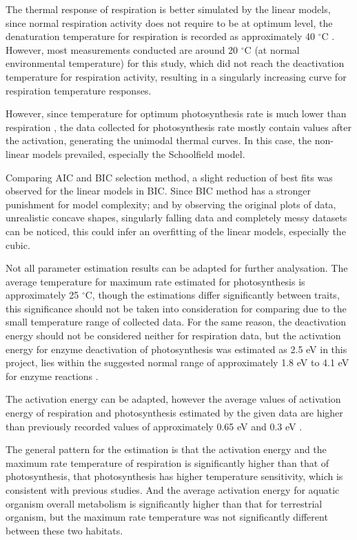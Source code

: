 \documentclass[11pt, a4paper]{article}
\begin{document}
\begin{spacing}{1.5}
The thermal response of respiration is better simulated by the linear models, since normal respiration activity does not require to be at optimum level, the denaturation temperature for respiration is recorded as approximately 40 $^{\circ}$C \citep{sage2007temperature}. However, most measurements conducted are around 20 $^{\circ}$C (at normal environmental temperature) for this study, which did not reach the deactivation temperature for respiration activity, resulting in a singularly increasing curve for respiration temperature responses. 

However, since temperature for optimum photosynthesis rate is much lower than respiration \citep{liu2018optimum}, the data collected for photosynthesis rate mostly contain values after the activation, generating the unimodal thermal curves. In this case, the non-linear models prevailed, especially the Schoolfield model. 

Comparing AIC and BIC selection method, a slight reduction of best fits was observed for the linear models in BIC. Since BIC method has a stronger punishment for model complexity; and by observing the original plots of data, unrealistic concave shapes, singularly falling data and completely messy datasets can be noticed, this could infer an overfitting of the linear models, especially the cubic. 

Not all parameter estimation results can be adapted for further analysation. The average temperature for maximum rate estimated for photosynthesis is approximately 25 $^{\circ}$C, though the estimations differ significantly between traits, this significance should not be taken into consideration for comparing due to the small temperature range of collected data. For the same reason, the deactivation energy should not be considered neither for respiration data,  but the activation energy for enzyme deactivation of photosynthesis was estimated as 2.5 eV in this project, lies within the suggested normal range of approximately 1.8 eV to 4.1 eV for enzyme reactions \cite{doran1995homogeneous}.

The activation energy can be adapted, however the average values of activation energy of respiration and photosynthesis estimated by the given data are higher than previously recorded values of approximately 0.65 eV and 0.3 eV \citep{allen2005linking, yvon2012reconciling}.

The general pattern for the estimation is that the activation energy and the maximum rate temperature of respiration is significantly higher than that of photosynthesis, that photosynthesis has higher temperature sensitivity, which is consistent with previous studies. And the average activation energy for aquatic organism overall metabolism is significantly higher than that for terrestrial organism, but the maximum rate temperature was not significantly different between these two habitats. 


\end{spacing}
\end{document}
